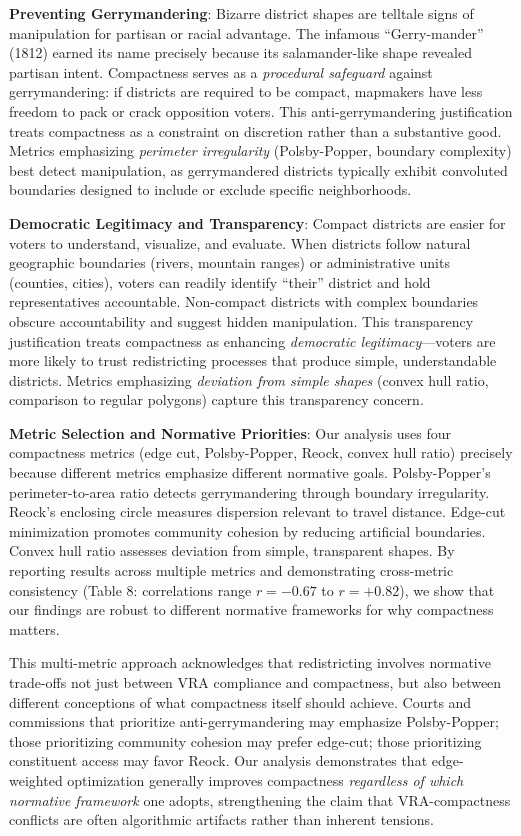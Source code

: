 \textbf{Preventing Gerrymandering}: Bizarre district shapes are telltale signs of manipulation for partisan or racial advantage. The infamous ``Gerry-mander'' (1812) earned its name precisely because its salamander-like shape revealed partisan intent. Compactness serves as a \emph{procedural safeguard} against gerrymandering: if districts are required to be compact, mapmakers have less freedom to pack or crack opposition voters. This anti-gerrymandering justification treats compactness as a constraint on discretion rather than a substantive good. Metrics emphasizing \emph{perimeter irregularity} (Polsby-Popper, boundary complexity) best detect manipulation, as gerrymandered districts typically exhibit convoluted boundaries designed to include or exclude specific neighborhoods.

\textbf{Democratic Legitimacy and Transparency}: Compact districts are easier for voters to understand, visualize, and evaluate. When districts follow natural geographic boundaries (rivers, mountain ranges) or administrative units (counties, cities), voters can readily identify ``their'' district and hold representatives accountable. Non-compact districts with complex boundaries obscure accountability and suggest hidden manipulation. This transparency justification treats compactness as enhancing \emph{democratic legitimacy}---voters are more likely to trust redistricting processes that produce simple, understandable districts. Metrics emphasizing \emph{deviation from simple shapes} (convex hull ratio, comparison to regular polygons) capture this transparency concern.

\textbf{Metric Selection and Normative Priorities}: Our analysis uses four compactness metrics (edge cut, Polsby-Popper, Reock, convex hull ratio) precisely because different metrics emphasize different normative goals. Polsby-Popper's perimeter-to-area ratio detects gerrymandering through boundary irregularity. Reock's enclosing circle measures dispersion relevant to travel distance. Edge-cut minimization promotes community cohesion by reducing artificial boundaries. Convex hull ratio assesses deviation from simple, transparent shapes. By reporting results across multiple metrics and demonstrating cross-metric consistency (Table 8: correlations range $r = -0.67$ to $r = +0.82$), we show that our findings are robust to different normative frameworks for why compactness matters.

This multi-metric approach acknowledges that redistricting involves normative trade-offs not just between VRA compliance and compactness, but also between different conceptions of what compactness itself should achieve. Courts and commissions that prioritize anti-gerrymandering may emphasize Polsby-Popper; those prioritizing community cohesion may prefer edge-cut; those prioritizing constituent access may favor Reock. Our analysis demonstrates that edge-weighted optimization generally improves compactness \emph{regardless of which normative framework} one adopts, strengthening the claim that VRA-compactness conflicts are often algorithmic artifacts rather than inherent tensions.


